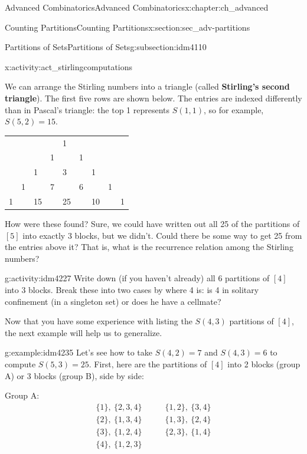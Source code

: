 \documentclass[oneside,10pt,]{book}
\newcommand{\terminology}[1]{\textbf{#1}}
\numberwithin{equation}{chapter}
\newcommand{\amp}{&}
\begin{document}
\begin{chapterptx}{Advanced Combinatorics}{}{Advanced Combinatorics}{}{}{x:chapter:ch_advanced}
\begin{sectionptx}{Counting Partitions}{}{Counting Partitions}{}{}{x:section:sec_adv-partitions}
\begin{subsectionptx}{Partitions of Sets}{}{Partitions of Sets}{}{}{g:subsection:idm4110}
\begin{activity}{}{x:activity:act_stirlingcomputations}
\end{activity}
We can arrange the Stirling numbers into a triangle (called \terminology{Stirling's second triangle}).  The first five rows are shown below.  The entries are indexed differently than in Pascal's triangle: the top 1 represents \(S(1,1)\), so for example, \(S(5,2) = 15\).%
\begin{sidebyside}{1}{0.25}{0.25}{0}%
\begin{sbspanel}{0.5}%
{\centering%
\begin{tabular}{lllllllll}
&&&&1&&&&\tabularnewline[0pt]
&&&1&&1&&&\tabularnewline[0pt]
&&1&&3&&1&&\tabularnewline[0pt]
&1&&7&&6&&1&\tabularnewline[0pt]
1&&15&&25&&10&&1
\end{tabular}
\par}
\end{sbspanel}%
\end{sidebyside}%
\par
How were these found?  Sure, we could have written out all 25 of the partitions of \([5]\) into exactly \(3\) blocks, but we didn't.  Could there be some way to get 25 from the entries above it?  That is, what is the recurrence relation among the Stirling numbers?%
\begin{activity}{}{g:activity:idm4227}%
Write down (if you haven't already) all 6 partitions of \([4]\) into \(3\) blocks.  Break these into two cases by where 4 is: is 4 in solitary confinement (in a singleton set) or does he have a cellmate?%
\end{activity}
Now that you have some experience with listing the \(S(4,3)\) partitions of \([4]\), the next example will help us to generalize.%
\begin{example}{}{g:example:idm4235}%
Let's see how to take \(S(4,2) = 7\) and \(S(4,3) = 6\) to compute \(S(5,3) = 25\).  First, here are the partitions of \([4]\) into 2 blocks (group A) or 3 blocks (group B), side by side:%
\begin{sidebyside}{2}{0.05}{0.05}{0.1}%
\begin{sbspanel}{0.5}%
Group A:%
\begin{align*}
\{1\}, ~ \{2,3,4\}\qquad \amp \{1,2\}, ~ \{3, 4\}\\
\{2\}, ~ \{1,3,4\}\qquad \amp \{1,3\}, ~ \{2, 4\}\\
\{3\}, ~ \{1,2,4\} \qquad \amp \{2,3\}, ~ \{1, 4\}\\
\{4\}, ~ \{1,2,3\} \qquad\amp 
\end{align*}
%
\end{sbspanel}%
\begin{sbspanel}{0.3}%

\end{sbspanel}
\end{sidebyside}
\end{example}
\end{subsectionptx}
\end{sectionptx}
\end{chapterptx}
\end{document}
